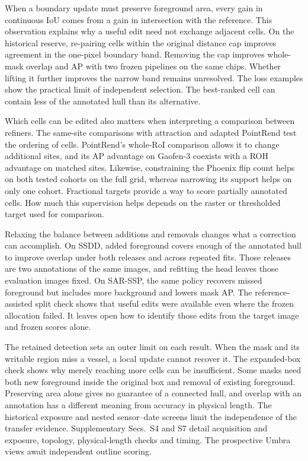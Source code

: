 \documentclass[journal]{IEEEtran}
\begin{document}
When a boundary update must preserve foreground area, every gain in continuous IoU comes from a gain in intersection with the reference. This observation explains why a useful edit need not exchange adjacent cells. On the historical reserve, re-pairing cells within the original distance cap improves agreement in the one-pixel boundary band. Removing the cap improves whole-mask overlap and AP with two frozen pipelines on the same chips. Whether lifting it further improves the narrow band remains unresolved. The loss examples show the practical limit of independent selection. The best-ranked cell can contain less of the annotated hull than its alternative.

Which cells can be edited also matters when interpreting a comparison between refiners. The same-site comparisons with attraction and adapted PointRend test the ordering of cells. PointRend's whole-RoI comparison allows it to change additional sites, and its AP advantage on Gaofen-3 coexists with a ROH advantage on matched sites. Likewise, constraining the Phoenix flip count helps on both tested cohorts on the full grid, whereas narrowing its support helps on only one cohort. Fractional targets provide a way to score partially annotated cells. How much this supervision helps depends on the raster or thresholded target used for comparison.

Relaxing the balance between additions and removals changes what a correction can accomplish. On SSDD, added foreground covers enough of the annotated hull to improve overlap under both releases and across repeated fits. Those releases are two annotations of the same images, and refitting the head leaves those evaluation images fixed. On SAR-SSP, the same policy recovers missed foreground but includes more background and lowers mask AP. The reference-assisted split check shows that useful edits were available even where the frozen allocation failed. It leaves open how to identify those edits from the target image and frozen scores alone.

The retained detection sets an outer limit on each result. When the mask and its writable region miss a vessel, a local update cannot recover it. The expanded-box check shows why merely reaching more cells can be insufficient. Some masks need both new foreground inside the original box and removal of existing foreground. Preserving area alone gives no guarantee of a connected hull, and overlap with an annotation has a different meaning from accuracy in physical length. The historical exposure and nested sensor--date screens limit the independence of the transfer evidence. Supplementary Secs.~S4 and S7 detail acquisition and exposure, topology, physical-length checks and timing. The prospective Umbra views await independent outline scoring.
\end{document}
